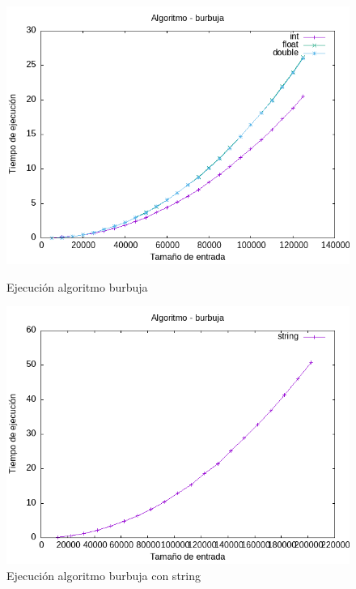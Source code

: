 \documentclass[11pt,openany]{book}
\begin{document}
\begin{figure}[H]
    \begin{minipage}{0.5\textwidth}
        \centering
        \includegraphics[width=\linewidth]{assets/Img/burbuja.png}
        \caption{Ejecución algoritmo burbuja}
        \label{fig:burbuja}
    \end{minipage}%
    \begin{minipage}{0.5\textwidth}
        \centering
        \includegraphics[width=\linewidth]{assets/Img/burbujastring.png}
        \caption{Ejecución algoritmo burbuja con string}
        \label{fig:burbujastring}
    \end{minipage}
\end{figure}
\end{document}
